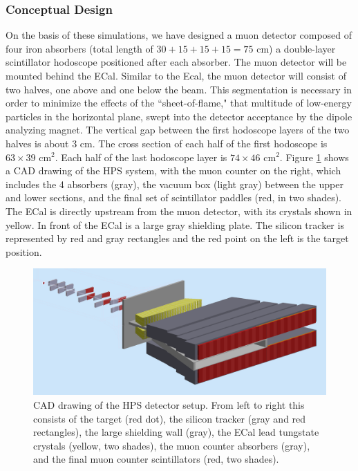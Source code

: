 \subsubsection{Conceptual Design}

On the basis of these simulations, we have designed a muon detector composed of four iron absorbers (total length of $30+15+15+15=75$ cm) a double-layer scintillator hodoscope positioned after each absorber. The muon detector will be mounted behind the ECal.  Similar to the Ecal, the muon detector will consist of two halves, one above and one below the beam.  This 
segmentation is necessary in order to
minimize the effects of the ``sheet-of-flame," that multitude of low-energy particles in the horizontal plane, swept into the detector acceptance by the dipole analyzing magnet.
The vertical gap between the first hodoscope layers of the two halves is about 3 cm. The cross section of each half of the first hodoscope is $63\times 39$ cm$^2$. Each half of the last hodoscope layer is $74\times 46$ cm$^2$.    Figure \ref{fig:HPS_view2} shows a CAD
drawing of the HPS system, with the muon counter on the right, which includes the 4 absorbers (gray), the vacuum box (light gray) between the upper and lower sections, and the final set of scintillator paddles (red, in two shades). The ECal is directly upstream from the muon detector, with its crystals shown in yellow.  In front of the ECal is a large gray shielding plate.  The silicon tracker is represented by red and gray rectangles and  the red point on the left is the target position.  

\begin{figure}[!ht]
\includegraphics[scale=0.22]{muon/HPS_view2.png}
\caption{\small{CAD drawing of the HPS detector setup.  From left to right this consists of the target (red dot), the silicon tracker
(gray and red rectangles), the large shielding wall (gray), the ECal lead tungstate crystals (yellow, two shades), the muon counter absorbers
(gray), and the final muon counter scintillators (red, two shades).}}
\label{fig:HPS_view2}
\end{figure}

